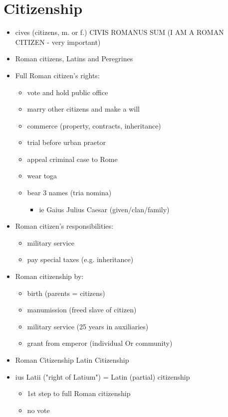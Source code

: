 \documentclass[12pt, twoside]{article}
\begin{document}
\section{Citizenship}
\begin{itemize}
\item cives (citizens, m. or f.) CIVIS ROMANUS SUM (I AM A ROMAN CITIZEN - very important)
\item Roman citizens, Latins and Peregrines
\item Full Roman citizen's rights:
	\begin{itemize}
	\item vote and hold public office
	\item marry other citizens and make a will
	\item commerce (property, contracts, inheritance)
	\item trial before urban praetor
	\item appeal criminal case to Rome
	\item wear toga
	\item bear 3 names (tria nomina)
		\begin{itemize}
	    \item ie Gaius Julius Caesar (given/clan/family)
	    \end{itemize}
	\end{itemize}
\item Roman citizen's responsibilities:
	\begin{itemize}
	\item military service
	\item pay special taxes (e.g. inheritance)
	\end{itemize}
\item Roman citizenship by: 
	\begin{itemize}
	\item birth (parents = citizens)
	\item manumission (freed slave of citizen)
	\item military service (25 years in auxiliaries)
	\item grant from emperor (individual Or community)\
	\end{itemize}
\item Roman Citizenship Latin Citizenship
\item ius Latii ("right of Latium") = Latin (partial) citizenship
	\begin{itemize}
	\item 1st step to full Roman citizenship
	\item no vote

\end{itemize}
\end{itemize}
\end{document}
